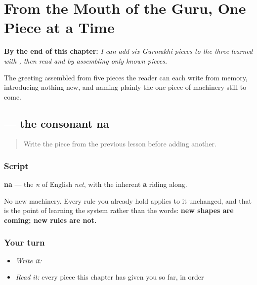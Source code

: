 
\chapter{From the Mouth of the Guru, One Piece at a Time}
\label{ch:pa-script-first}

\begin{chapteropening}
\textbf{By the end of this chapter:} \emph{I can add six Gurmukhi pieces to the three learned with , then read  and  by assembling only known pieces.}

The greeting assembled from five pieces the reader can each write from memory, introducing nothing new, and naming plainly the one piece of machinery still to come.
\end{chapteropening}

\section[\texorpdfstring{\pa{ਨ} (na)}{ਨ (na)}]{ — the consonant na}

\label{lesson:PA-W01-na}



\begin{quote}
Write the piece from the previous lesson before adding another.
\end{quote}

\subsection*{Script}

\begin{quote}
\end{quote}

\textbf{na} — the \emph{n} of English \emph{net}, with the inherent \textbf{a} riding along.

No new machinery. Every rule you already hold applies to it unchanged, and that is the point of learning the system rather than the words: \textbf{new shapes are coming; new rules are not.}

\subsection*{Your turn}
\begin{itemize}
\raggedright
  \item \emph{Write it:} 
  \item \emph{Read it:} every piece this chapter has given you so far, in order
\end{itemize}

